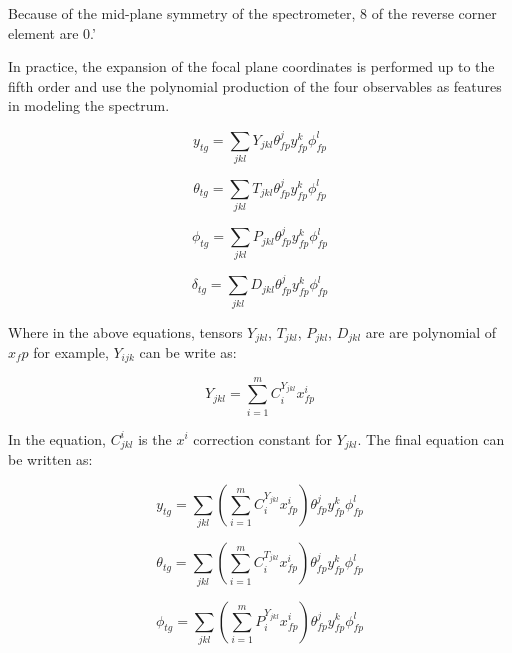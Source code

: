 Because of the mid-plane symmetry of the spectrometer, 8 of the reverse corner element are $0$.'


In practice, the expansion of the focal plane coordinates is performed up to the fifth order and use the polynomial production of the four observables as features in modeling the spectrum. 

\begin{equation}
    y_{tg} = \sum_{jkl}Y_{jkl}\theta^j_{fp}y^k_{fp}\phi^l_{fp}
\end{equation}


\begin{equation}
    \theta_{tg} = \sum_{jkl}T_{jkl}\theta^j_{fp}y^k_{fp}\phi^l_{fp}
\end{equation}


\begin{equation}
    \phi_{tg} = \sum_{jkl}P_{jkl}\theta^j_{fp}y^k_{fp}\phi^l_{fp}
\end{equation}


\begin{equation}
    \delta_{tg} = \sum_{jkl}D_{jkl}\theta^j_{fp}y^k_{fp}\phi^l_{fp}
\end{equation}

Where in the above equations, tensors $Y_{jkl}$, $T_{jkl}$, $P_{jkl}$, $D_{jkl}$ are are polynomial of $x_fp$ for example, $Y_{ijk}$ can be write as:

\begin{equation}
    Y_{jkl} = \sum^m_{i=1}C_i^{Y_{jkl}}x^i_{fp}
\end{equation}

In the equation, $C^i_{jkl}$ is the $x^i$ correction constant for $Y_{jkl}$. The final equation can be written as:

\begin{equation}
    y_{tg} = \sum_{jkl} (\sum^m_{i=1}C_i^{Y_{jkl}}x^i_{fp}) \theta^j_{fp}y^k_{fp}\phi^l_{fp}
\end{equation}


\begin{equation}
    \theta_{tg} = \sum_{jkl}(\sum^m_{i=1}C_i^{T_{jkl}}x^i_{fp})\theta^j_{fp}y^k_{fp}\phi^l_{fp}
\end{equation}


\begin{equation}
    \phi_{tg} = \sum_{jkl}(\sum^m_{i=1}P_i^{Y_{jkl}}x^i_{fp})\theta^j_{fp}y^k_{fp}\phi^l_{fp}
\end{equation}


